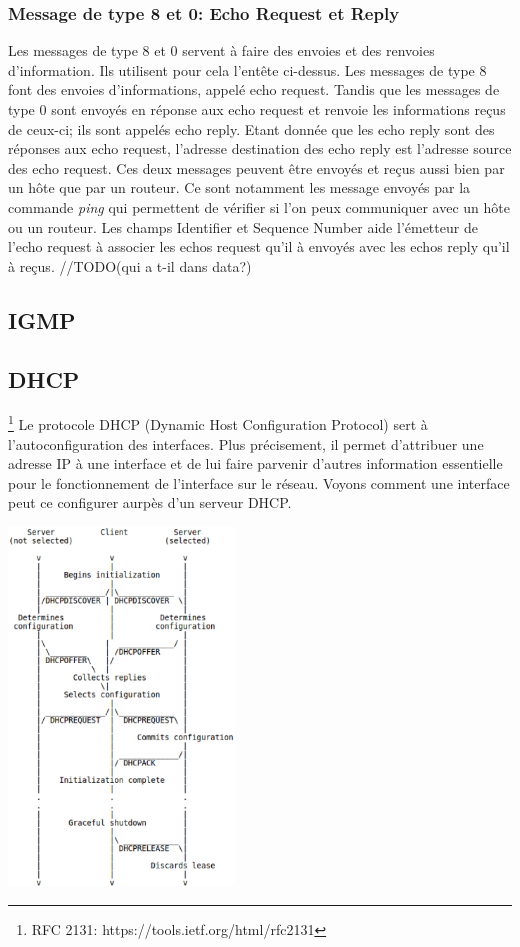 \subsubsection{Message de type 8 et 0: Echo Request et Reply} Les messages de type 8 et 0 servent à
faire des envoies et des renvoies d'information. Ils utilisent pour cela
l'entête ci-dessus. Les messages de type 8 font des envoies d'informations,
appelé echo request. Tandis que les messages de type 0 sont envoyés en réponse
aux echo request et renvoie les informations reçus de ceux-ci; ils sont appelés
echo reply. Etant donnée que les echo reply sont des réponses aux echo request,
l'adresse destination des echo reply est l'adresse source des echo request. Ces
deux messages peuvent être envoyés et reçus aussi bien par un hôte que par un
routeur. Ce sont notamment les message envoyés par la commande {\it ping} qui
permettent de vérifier si l'on peux communiquer avec un hôte ou un routeur.  Les
champs Identifier et Sequence Number aide l'émetteur de l'echo request à
associer les echos request qu'il à envoyés avec les echos reply qu'il à reçus.
//TODO(qui a t-il dans data?)

\subsection{IGMP}


\subsection{DHCP} \footnote{RFC 2131: https://tools.ietf.org/html/rfc2131} Le
protocole DHCP (Dynamic Host Configuration Protocol) sert à l'autoconfiguration
des interfaces. Plus précisement, il  permet d'attribuer une adresse IP à une
interface et de lui faire parvenir d'autres information essentielle pour le
fonctionnement de l'interface sur le réseau.  Voyons comment une interface peut
ce configurer aurpès d'un serveur DHCP.

\includegraphics[width=6cm]{./pics/timeline_dhcp.eps}

